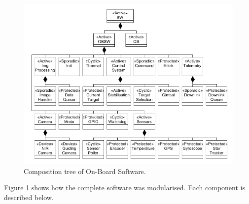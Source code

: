 \begin{figure}[H]
    \centering
    \includegraphics[width=\textwidth]{4-experiment-design/img/software/composition-tree.png}
    \caption{Composition tree of On-Board Software.}
    \label{fig:software-composition-tree}
\end{figure}

Figure \ref{fig:software-composition-tree} shows how the complete software was modularised. Each component is described below.

